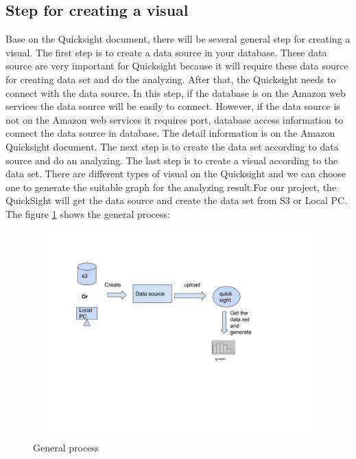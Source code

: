     \subsection{Step for creating a visual}
    Base on the Quicksight document, there will be several general step for creating a visual. The first step is to create a data source in your database. These data source are very important for Quicksight because it will require these data source for creating data set and do the analyzing. After that, the Quicksight needs to connect with the data source. In this step, if the database is on the Amazon web services the data source will be easily to connect. However, if the data source is not on the Amazon web services it requires port, database access information to connect the data source in database. The detail information is on the Amazon Quicksight document. The next step is to create the data set according to data source and do an analyzing. The last step is to create a visual according to the data set. There are different types of visual on the Quicksight and we can choose one to generate the suitable graph for the analyzing result.\cite{w4}For our project, the QuickSight will get the data source and create the data set from S3 or Local PC.\\
    The figure \ref{fig:2} shows the general process:
    \begin{figure}[h]
    \includegraphics[width=16cm, height=8cm]{6.jpg}
    \centering
    \caption{\label{fig:2}General process}
    \end{figure}

